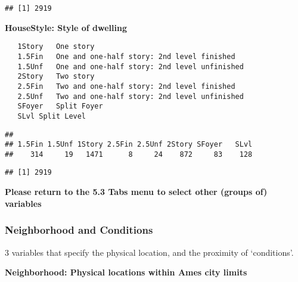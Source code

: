 \documentclass[]{article}
\newenvironment{Shaded}{\begin{snugshade}}{\end{snugshade}}
\newcommand{\KeywordTok}[1]{\textcolor[rgb]{0.13,0.29,0.53}{\textbf{#1}}}
\newcommand{\StringTok}[1]{\textcolor[rgb]{0.31,0.60,0.02}{#1}}
\newcommand{\CommentTok}[1]{\textcolor[rgb]{0.56,0.35,0.01}{\textit{#1}}}
\newcommand{\OperatorTok}[1]{\textcolor[rgb]{0.81,0.36,0.00}{\textbf{#1}}}
\newcommand{\NormalTok}[1]{#1}
\begin{document}
\begin{verbatim}
## [1] 2919
\end{verbatim}

\textbf{HouseStyle: Style of dwelling}

\begin{verbatim}
   1Story   One story
   1.5Fin   One and one-half story: 2nd level finished
   1.5Unf   One and one-half story: 2nd level unfinished
   2Story   Two story
   2.5Fin   Two and one-half story: 2nd level finished
   2.5Unf   Two and one-half story: 2nd level unfinished
   SFoyer   Split Foyer
   SLvl Split Level
\end{verbatim}

\begin{Shaded}
\end{Shaded}

\begin{verbatim}
## 
## 1.5Fin 1.5Unf 1Story 2.5Fin 2.5Unf 2Story SFoyer   SLvl 
##    314     19   1471      8     24    872     83    128
\end{verbatim}

\begin{Shaded}
\end{Shaded}

\begin{verbatim}
## [1] 2919
\end{verbatim}

\textbf{Please return to the 5.3 Tabs menu to select other (groups of)
variables}

\subsubsection{Neighborhood and
Conditions}\label{neighborhood-and-conditions}

3 variables that specify the physical location, and the proximity of
`conditions'.

\textbf{Neighborhood: Physical locations within Ames city limits}
\end{document}
